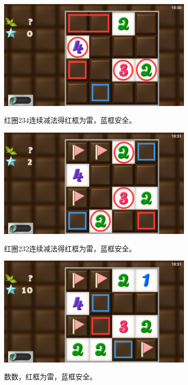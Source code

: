 \subsection{} %
\begin{center}
    \includegraphics[width=0.7\textwidth]{puzzle/122-1.png}
\end{center}
红圈234连续减法得红框为雷，蓝框安全。
\begin{center}
    \includegraphics[width=0.7\textwidth]{puzzle/122-2.png}
\end{center}
红圈232连续减法得红框为雷，蓝框安全。
\begin{center}
    \includegraphics[width=0.7\textwidth]{puzzle/122-3.png}
\end{center}
数数，红框为雷，蓝框安全。

